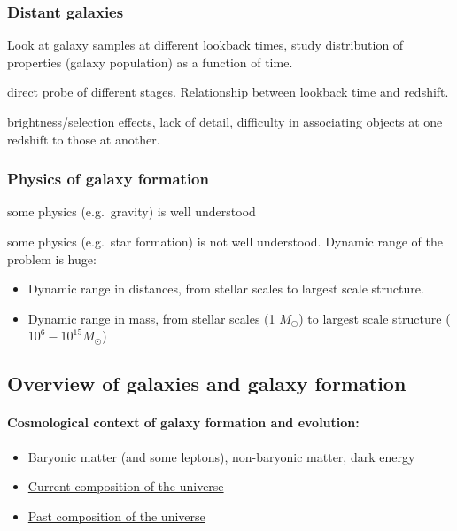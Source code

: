 \documentclass{article}
\begin{document}
\subsubsection{Distant galaxies}
Look at galaxy samples at different lookback times, study distribution of
properties (galaxy population) as a function of time.
\begin{description}[labelindent=2em, labelwidth=8em, leftmargin=12em]
    \item [Advantages] direct probe of different stages.
        \href{http://astronomy.nmsu.edu/holtz/a555/html/diagrams/misc/tz_lcdm.htm}
        {Relationship between lookback time and redshift}.
    \item [Disadvantages] brightness/selection effects, lack of detail,
        difficulty in associating objects at one redshift to those at another.
\end{description}
\subsubsection{Physics of galaxy formation}
\begin{description}[labelindent=2em, labelwidth=8em, leftmargin=12em]
    \item [Advantages] some physics (e.g.\ gravity) is well understood
    \item [Disadvantages] some physics (e.g.\ star formation) is not well
        understood. Dynamic range of the problem is huge:
        \begin{itemize}
            \item Dynamic range in distances, from stellar scales
                to largest scale structure.
            \item Dynamic range in mass, from stellar scales
                (1 $M_{\odot}$) to
                largest scale structure ($10^6-10^{15} M_{\odot}$)
        \end{itemize}
\end{description}

\subsection{Overview of galaxies and galaxy formation}
\paragraph{Cosmological context of galaxy formation and evolution:}
\begin{itemize}
    \item Baryonic matter (and some leptons), non-baryonic matter, dark energy
    \item \href{http://astronomy.nmsu.edu/holtz/a555/resources/Cosmological_Composition_1.png}
        {Current composition of the universe}
    \item \href{http://astronomy.nmsu.edu/holtz/a555/resources/Cosmological_Composition_2.png}
        {Past composition of the universe}
\end{itemize}
\end{document}
